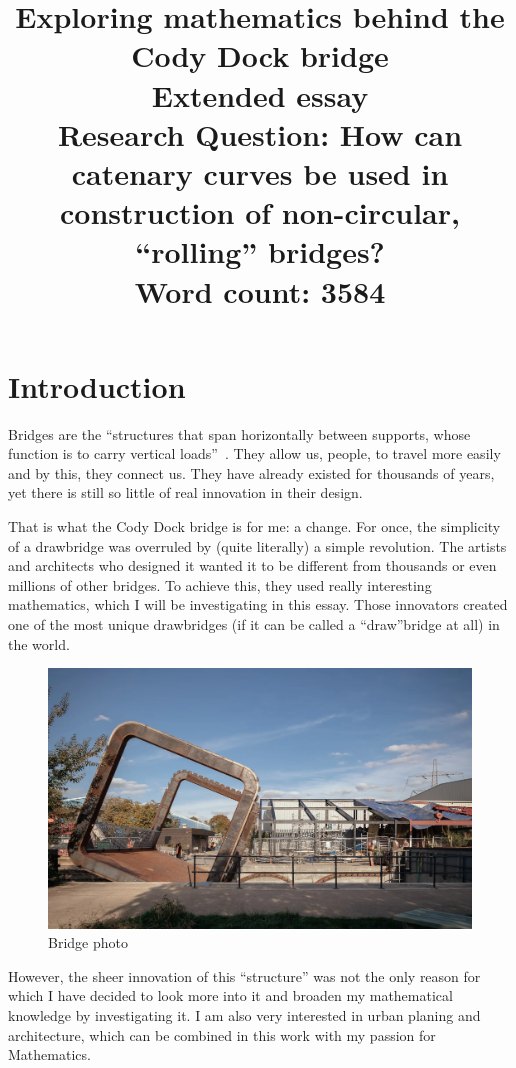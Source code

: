 \documentclass[12pt]{article}
\title{Exploring mathematics behind the Cody Dock bridge \\
    \large Extended essay \\
    \normalsize Research Question: How can catenary curves be used in construction of non-circular, ``rolling'' bridges? \\
    \vspace{12pt} Word count: 3584}
\date{}
\author{}
\begin{document}
    \maketitle
    \newpage
    \tableofcontents
    \newpage
    
    \section{Introduction}

        Bridges are the ``structures that span horizontally between supports, whose function is to carry vertical loads''~\cite{bridge_encyplopedia}. They allow us, people, to travel more easily and by this, they connect us. They have already existed for thousands of years, yet there is still so little of real innovation in their design.
    
        That is what the Cody Dock bridge is for me: a change. For once, the simplicity of a drawbridge was overruled by (quite literally) a simple revolution. The artists and architects who designed it wanted it to be different from thousands or even millions of other bridges. To achieve this, they used really interesting mathematics, which I will be investigating in this essay. Those innovators created one of the most unique drawbridges (if it can be called a ``draw''bridge at all) in the world.

        \begin{figure}[H]
            \centering
            \includegraphics[width=0.75\linewidth]{images/bridge.png}
            \caption[Bridge photo]{Bridge photo~\cite{bridge_photos}}\label{fig:bridge_photo}
        \end{figure}

        However, the sheer innovation of this ``structure'' was not the only reason for which I have decided to look more into it and broaden my mathematical knowledge by investigating it. I am also very interested in urban planing and architecture, which can be combined in this work with my passion for Mathematics.
\end{document}
